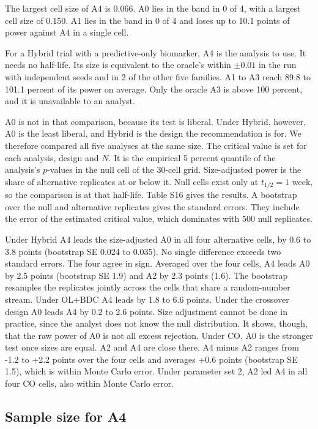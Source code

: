 \documentclass[
  11pt,
]{article}
\begin{document}
The largest cell size of A4 is
0.066. A0 lies in the band in 0 of 4, with a largest
cell size of 0.150. A1 lies in the
band in 0 of 4 and loses up to
10.1 points of
power against A4 in a single cell.

For a Hybrid trial with a predictive-only biomarker, A4 is the
analysis to use. It needs no half-life. Its size is equivalent to the
oracle's within \(\pm 0.01\) in the run with independent seeds and in
2 of the other five families. A1 to A3 reach
89.8
to 101.1
percent of its power on average. Only the oracle A3 is above 100
percent, and it is unavailable to an analyst.

A0 is not in that comparison, because its test is liberal. Under
Hybrid, however, A0 is the least liberal, and Hybrid is the
design the recommendation is for. We therefore compared all five
analyses at the same size. The critical value is set for each
analysis, design and \(N\). It is the empirical 5 percent quantile of
the analysis's \(p\)-values in the null cell of the 30-cell grid.
Size-adjusted power is the share of alternative replicates at or
below it. Null cells exist only
at \(t_{1/2} = 1\) week, so the comparison is at that half-life. Table
S16 gives the results. A bootstrap over the null and alternative
replicates gives the standard errors. They include the error of the
estimated critical value, which dominates with 500 null replicates.

Under Hybrid A4 leads the size-adjusted A0 in all four alternative
cells, by 0.6 to
3.8 points (bootstrap
SE 0.024 to
0.035). No single
difference exceeds two standard errors. The four agree in sign.
Averaged over the four cells, A4 leads A0 by
2.5 points (bootstrap SE
1.9) and A2 by
2.3 points
(1.6). The bootstrap
resamples the replicates jointly across the cells that share a
random-number stream. Under OL+BDC A4 leads by
1.8 to
6.6 points. Under the
crossover design A0 leads A4 by
0.2 to
2.6 points. Size
adjustment cannot be done in practice, since the analyst does not
know the null distribution. It shows, though, that the raw power of
A0 is not all excess rejection. Under CO, A0 is the stronger test once
sizes are equal. A2 and A4 are close there. A4 minus A2 ranges from
-1.2 to
+2.2 points over the four
cells and averages
+0.6 points (bootstrap SE
1.5), which is within
Monte Carlo error. Under parameter set 2, A2 led A4 in all four CO
cells, also within Monte Carlo error.

\subsection{Sample size for A4}\label{sec-samplesize}
\end{document}
